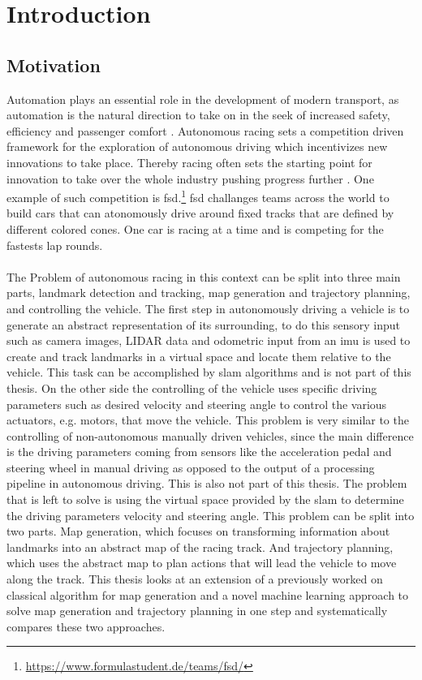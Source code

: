 \graphicspath{{Chapter/Figs/introduction/}}
\chapter{Introduction}

\section{Motivation}
Automation plays an essential role in the development of modern transport, as automation is the natural direction to take on in the seek of increased safety, efficiency and passenger comfort \cite{Lutin2018}. Autonomous racing sets a competition driven framework for the exploration of autonomous driving which incentivizes new innovations to take place. Thereby racing often sets the starting point for innovation to take over the whole industry pushing progress further \cite{Foxall91}. One example of such competition is \ac{fsd}.\footnote{\url{https://www.formulastudent.de/teams/fsd/}} \ac{fsd} challanges teams across the world to build cars that can atonomously drive around fixed tracks that are defined by different colored cones. One car is racing at a time and is competing for the fastests lap rounds.\\
\\The Problem of autonomous racing in this context can be split into three main parts, landmark detection and tracking, map generation and trajectory planning, and controlling the vehicle. The first step in autonomously driving a vehicle is to generate an abstract representation of its surrounding, to do this sensory input such as camera images, LIDAR data and odometric input from an \ac{imu} is used to create and track landmarks in a virtual space and locate them relative to the vehicle. This task can be accomplished by \ac{slam} algorithms \cite{Singandhupe2019} and is not part of this thesis. On the other side the controlling of the vehicle uses specific driving parameters such as desired velocity and steering angle to control the various actuators, e.g. motors, that move the vehicle. This problem is very similar to the controlling of non-autonomous manually driven vehicles, since the main difference is the driving parameters coming from sensors like the acceleration pedal and steering wheel in manual driving as opposed to the output of a processing pipeline in autonomous driving. This is also not part of this thesis. The problem that is left to solve is using the virtual space provided by the \ac{slam} to determine the driving parameters velocity and steering angle. This problem can be split into two parts. Map generation, which focuses on transforming information about landmarks into an abstract map of the racing track. And trajectory planning, which uses the abstract map to plan actions that will lead the vehicle to move along the track. This thesis looks at an extension of a previously worked on classical algorithm for map generation and a novel machine learning approach to solve map generation and trajectory planning in one step and systematically compares these two approaches.\\
